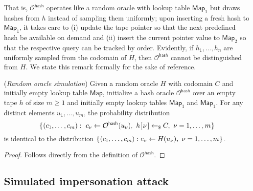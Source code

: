 \documentclass{iacrtrans}
\begin{document}
\noindent
That is, $\mathcal{O}^{\mathsf{hash}}$
operates like a random oracle with lookup table $\mathsf{Map}_1$
but draws hashes
from $h$ instead of sampling them uniformly;
upon inserting a fresh hash to $\mathsf{Map}_1$,
it takes care to
(i) update the tape pointer so that
the next predefined hash be available on demand and
(ii) insert the current pointer value to $\mathsf{Map}_2$
so that the respective query can be tracked by order.
Evidently, if $h_1, \dots, h_n$
are uniformly sampled from the codomain of $H$,
then $\mathcal{O}^{\mathsf{hash}}$
cannot be distinguished from $H$.
We state this remark formally for the sake of reference.

\begin{lem}\label{lemma_random_oracle_simulation}
\textup{(\textit{Random oracle simulation})}
Given a random oracle $H$ with codomain $C$
and initially empty lookup table $\mathsf{Map}$,
initialize a hash oracle $\mathcal{O}^{\mathsf{hash}}$
over an empty tape $h$ of size $m \ge 1$
and initially empty lookup tables $\mathsf{Map}_1$ and $\mathsf{Map}_1$.
For any distinct elements $u_1, \dots, u_m$,
the probability distribution
\vspace{5pt}
\begin{equation*}
\vspace{5pt}
\{\hspace{0.5pt}(c_1, \dots, c_m):
\ c_\nu \leftarrow \mathcal{O}^{\mathsf{hash}}(u_\nu),
\ h\hspace{0.5pt}
	[
		\hspace{1pt}
		\nu
		\hspace{1pt}
	]
	\leftarrow_\$
	C,
\ \nu = 1, \dots, m\hspace{0.5pt}\}
\end{equation*}
is identical to the distribution
$
\{\hspace{0.5pt}(c_1, \dots, c_m):\hspace{0.50pt}
c_\nu \leftarrow H(u_\nu),
\ \nu = 1, \dots, m\hspace{0.5pt}\}
$.
\end{lem}

\begin{proof}
Follows directly from the definition of $\mathcal{O}^{\mathsf{hash}}$.
\end{proof}

\subsection{Simulated impersonation attack}\label{section_simulated_impersonation_attack}
\end{document}
